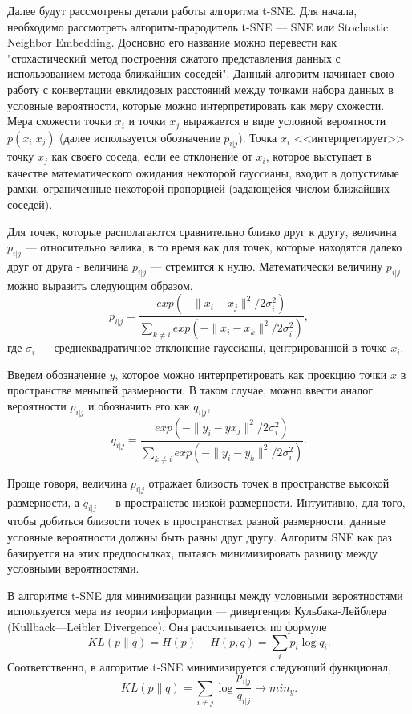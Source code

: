 \documentclass[runningheads]{llncs}
\begin{document}
Далее будут рассмотрены детали работы алгоритма t-SNE. Для начала, необходимо рассмотреть алгоритм-прародитель t-SNE — SNE или Stochastic Neighbor Embedding. Досновно его название можно перевести как "стохастический метод построения сжатого представления данных с использованием метода ближайших соседей". Данный алгоритм начинает свою работу с конвертации евклидовых расстояний между точками набора данных в условные вероятности, которые можно интерпретировать как меру схожести. Мера схожести точки $x_i$ и точки $x_j$ выражается в виде условной вероятности $p(x_i | x_j)$ (далее используется обозначение $p_{i|j}$). Точка $x_i$ <<интерпретирует>> точку $x_j$ как своего соседа, если ее отклонение от $x_i$, которое выступает в качестве математического ожидания некоторой гауссианы, входит в допустимые рамки, ограниченные некоторой пропорцией (задающейся числом ближайших соседей). \par

Для точек, которые располагаются сравнительно близко друг к другу, величина $p_{i|j}$ — относительно велика, в то время как для точек, которые находятся далеко друг от друга - величина $p_{i|j}$ — стремится к нулю. Математически величину $p_{i|j}$ можно выразить следующим образом, $$p_{i|j} = \frac{exp(-\|x_i - x_j\|^2 / 2\sigma_i^2)}{\sum_{k \neq i} exp(-\|x_i - x_k\|^2 / 2\sigma_i^2)},$$
где $\sigma_i$ — среднеквадратичное отклонение гауссианы, центрированной в точке $x_i$. \par

Введем обозначение $y$, которое можно интерпретировать как проекцию точки $x$ в пространстве меньшей размерности. В таком случае, можно ввести аналог вероятности $p_{i|j}$ и обозначить его как $q_{i|j}$, $$q_{i|j} = \frac{exp(-\|y_i - yx_j\|^2 / 2\sigma_i^2)}{\sum_{k \neq i} exp(-\|y_i - y_k\|^2 / 2\sigma_i^2)}.$$

Проще говоря, величина $p_{i|j}$ отражает близость точек в пространстве высокой размерности, а $q_{i|j}$ — в пространстве низкой размерности. Интуитивно, для того, чтобы добиться близости точек в пространствах разной размерности, данные условные вероятности должны быть равны друг другу. Алгоритм SNE как раз базируется на этих предпосылках, пытаясь минимизировать разницу между условными вероятностями. \par

В алгоритме t-SNE для минимизации разницы между условными вероятностями используется мера из теории информации — дивергенция Кульбака-Лейблера (Kullback—Leibler Divergence). Она рассчитывается по формуле $$KL(p \| q) = H(p) - H(p, q) = \sum_i p_i \log{q_i}.$$ Соответственно, в алгоритме t-SNE минимизируется следующий функционал,
$$KL(p \| q) = \sum_{i\neq j} \log\frac{p_{i|j}}{q_{i|j}} \rightarrow min_y.$$
\end{document}
